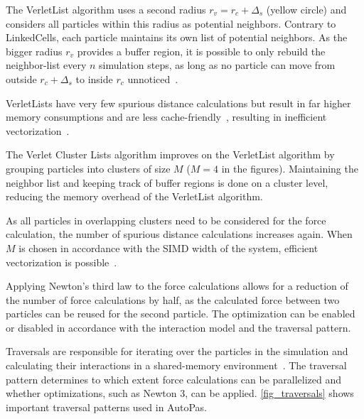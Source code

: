 \documentclass[conference]{IEEEtran}
\begin{document}
\begin{description}[style=nextline]
\begin{description}[style=nextline, font=\itshape\mdseries]
            \item[VerletLists]
                The VerletList algorithm uses a second radius $r_v = {r_c} + \Delta_s$ (yellow circle) and considers all particles within this radius as potential neighbors. Contrary to LinkedCells, each particle maintains its own list of potential neighbors. As the bigger radius $r_v$ provides a buffer region, it is possible to only rebuild the neighbor-list every $n$ simulation steps, as long as no particle can move from outside $r_c + \Delta_s$ to inside $r_c$ unnoticed~\cite{NEWCOME2023115278}.

                VerletLists have very few spurious distance calculations but result in far higher memory consumptions and are less cache-friendly~\cite{Gratl2022AutoPas}, resulting in inefficient vectorization~\cite{PALL20132641}.

            \item[VerletClusterList]
                The Verlet Cluster Lists algorithm improves on the VerletList algorithm by grouping particles into clusters of size $M$ ($M=4$ in the figures). Maintaining the neighbor list and keeping track of buffer regions is done on a cluster level, reducing the memory overhead of the VerletList algorithm.

                As all particles in overlapping clusters need to be considered for the force calculation, the number of spurious distance calculations increases again. When $M$ is chosen in accordance with the SIMD width of the system, efficient vectorization is possible~\cite{Gratl2022AutoPas}.
        \end{description}


    \item[Newton 3]
        Applying Newton's third law to the force calculations allows for a reduction of the number of force calculations by half, as the calculated force between two particles can be reused for the second particle. The optimization can be enabled or disabled in accordance with the interaction model and the traversal pattern.

    \item[Traversal]
        Traversals are responsible for iterating over the particles in the simulation and calculating their interactions in a shared-memory environment~\cite{SECKLER2021101296}. The traversal pattern determines to which extent force calculations can be parallelized and whether optimizations, such as Newton 3, can be applied. \autoref{fig_traversals} shows important traversal patterns used in AutoPas.


\end{description}
\end{document}
